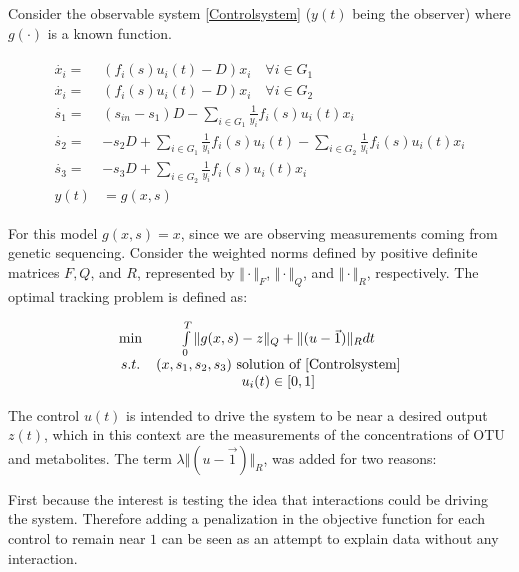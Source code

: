 \documentclass[3p,times]{elsarticle}
\begin{document}
Consider the observable system \eqref{Controlsystem} ($y(t)$ being the observer) where $g(\cdot)$ is a known function.

\begin{align} 
\label{Controlsystem}
\begin{array}{cl}
\dot{x_i} =& \left(f_i(s)u_i(t) -D \right)x_i \quad \forall i \in G_1\\
\dot{x_i} =& \left(f_i(s)u_i(t) -D \right)x_i \quad \forall i \in G_2\\
\dot{s_1} =& \displaystyle (s_{in}-s_1)D-\sum\limits_{i \in G_1}\frac{1}{y_i}f_i(s)u_i(t) x_i  \\
\dot{s_2} = & \displaystyle -s_2D+\sum\limits_{i \in G_1}\frac{1}{y_i}f_i(s)u_i(t)	-\sum\limits_{i \in G_2}\frac{1}{y_i}f_i(s)u_i(t) x_i  \\
\dot{s_3} =&  \displaystyle -s_3D+\sum\limits_{i \in G_2}\frac{1}{y_i}f_i(s)u_i(t) x_i \\
y(t) & = g(x,s)
\end{array}
\end{align}	

For this model $g(x,s) = x$, since we are observing measurements coming from genetic sequencing. Consider the weighted norms defined by positive definite matrices $F,Q$, and $R$, represented by $\Vert \cdot \Vert_F$, $\Vert \cdot \Vert_Q$, and $\Vert \cdot \Vert_R$, respectively. The optimal tracking problem is defined as: 

\begin{align}
\label{Optimal Control} \begin{array}{cc} \min &  \int \limits_{0}^{T} \Vert g(x,s) - z \Vert_Q + \Vert(u -\vec{1}) \Vert_R dt\\
s.t.& 
(x,s_1,s_2,s_3)\mbox{ solution of \eqref{Controlsystem}} \\
&u_i(t) \in [0,1]
\end{array}	
\end{align} 

The control $u(t)$ is intended to drive the system to be near a desired output $z(t)$, which in this context are the measurements of the concentrations of OTU and metabolites. The term $\lambda \Vert(u -\vec{1}) \Vert_R$, was added for two reasons:

First because the interest is testing the idea that interactions could be driving the system. Therefore adding a penalization in the objective function for each control to remain near $1$ can be seen as an attempt to explain data without any interaction.
\end{document}
